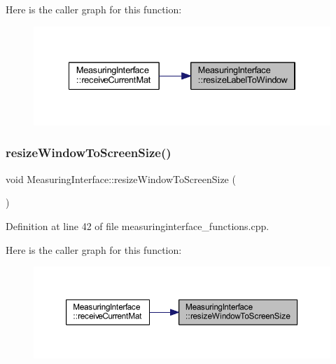 Here is the caller graph for this function\+:
\nopagebreak
\begin{figure}[H]
\begin{center}
\leavevmode
\includegraphics[width=334pt]{class_measuring_interface_a167a8fe58e371ea039490e90aa07c87d_icgraph}
\end{center}
\end{figure}
\mbox{\label{class_measuring_interface_aad66adca9dfebeb4bec1a83c1fd7c043}} 
\subsubsection{\texorpdfstring{resizeWindowToScreenSize()}{resizeWindowToScreenSize()}}
{\footnotesize\ttfamily void Measuring\+Interface\+::resize\+Window\+To\+Screen\+Size (\begin{DoxyParamCaption}{ }\end{DoxyParamCaption})\hspace{0.3cm}{\ttfamily [private]}}



Definition at line 42 of file measuringinterface\+\_\+functions.\+cpp.

Here is the caller graph for this function\+:
\nopagebreak
\begin{figure}[H]
\begin{center}
\leavevmode
\includegraphics[width=350pt]{class_measuring_interface_aad66adca9dfebeb4bec1a83c1fd7c043_icgraph}
\end{center}
\end{figure}
\mbox{\label{class_measuring_interface_a1c458529cab62e1c2aa540107aa5285a}} 
